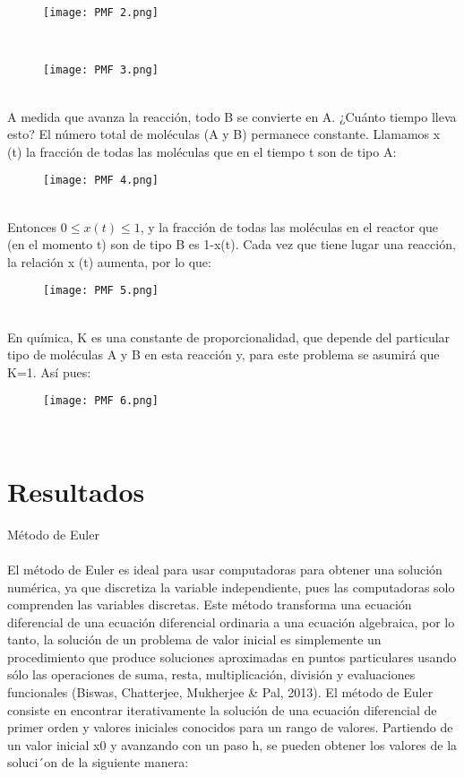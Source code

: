 \documentclass{article}
\begin{document}
\begin{figure}[h!]
\centering
\texttt{[image: PMF 2.png]}
\end{figure}
\\

\begin{figure}[h!]
\centering
\texttt{[image: PMF 3.png]}
\end{figure}
\\
A medida que avanza la reacción, todo B se convierte en A. ¿Cuánto tiempo lleva esto?
El número total de moléculas (A y B) permanece constante.
Llamamos x (t) la fracción de todas las moléculas que en el tiempo t son de tipo A:

\begin{figure}[h!]
\centering
\texttt{[image: PMF 4.png]}
\end{figure}
\\

Entonces $0 \leq x(t) \leq 1$, y la fracción de todas las moléculas en el reactor que (en el momento t) son de tipo B es 1-x(t). Cada vez que tiene lugar una reacción, la relación x (t) aumenta, por lo que:

\begin{figure}[h!]
\centering
\texttt{[image: PMF 5.png]}
\end{figure}
\\

En química, K es una constante de proporcionalidad, que depende del particular tipo de moléculas A y B en esta reacción y, para este problema se asumirá que K=1. Así pues:

\begin{figure}[h!]
\centering
\texttt{[image: PMF 6.png]}
\end{figure}
\\

\section{Resultados}

Método de Euler
\\
\\
El método de Euler es ideal para usar computadoras para obtener una solución numérica, ya que discretiza la variable independiente, pues las computadoras solo comprenden las variables discretas. Este método transforma una ecuación diferencial de una ecuación diferencial ordinaria a una ecuación algebraica, por lo tanto, la solución de un problema de valor inicial es simplemente un procedimiento que produce soluciones aproximadas en puntos particulares usando sólo las operaciones de suma, resta, multiplicación, división y evaluaciones funcionales (Biswas, Chatterjee, Mukherjee & Pal, 2013).
El método de Euler consiste en encontrar iterativamente la solución de una ecuación diferencial de primer orden y valores iniciales conocidos para un rango de valores. Partiendo de un valor inicial x0 y avanzando con un paso h, se pueden obtener los valores de la soluci´on de la siguiente manera:
\end{document}
